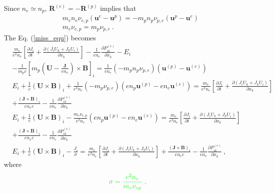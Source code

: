 \documentclass[12pt,a4paper]{article}
\renewcommand{\vec}[1]{\boldsymbol{#1}}
\begin{document}
Since $n_e \simeq n_p$, $\vec{R}^{(e)} = -\vec{R}^{(p)}$ implies that 
\begin{align*}
& \boxed{m_e n_e \nu_{e,p} (\vec{u}^{e} -\vec{u}^{p}) = -m_p n_p \nu_{p,e} (\vec{u}^{p} -\vec{u}^{e}) } \\
& m_e \nu_{e, p} = m_p \nu_{p, e} ~. 
\end{align*}
The Eq. (\ref{miss_equ}) becomes
\begin{align}
\nonumber & \boxed{ \frac{m_e}{e^2 n_e} \left[\frac{\partial J_i}{\partial t} +\frac{\partial (J_i U_k +J_k U_i)}{\partial x_k} \right] -\frac{1}{en_e} \frac{\partial P_{ik}^{(e)}}{\partial x_k} -E_i } \\ 
\nonumber & \boxed{ -\frac{1}{m_pc}\left[m_p\left( \vec{U}-\frac{\vec{J}}{en_e} \right)\times \vec{B} \right]_i = \frac{1}{en_e}(-m_pn_p \nu_{p,e}) \left(\vec{u}^{(p)} -\vec{u}^{(e)} \right) } \\
\nonumber & \boxed{E_i +\frac{1}{c} (\vec{U} \times \vec{B})_i + \frac{1}{e^2n_e}(-m_p \nu_{p,e}) \left(e n_p \vec{u}^{(p)} - en_e\vec{u}^{(e)} \right) = \frac{m_e}{e^2 n_e} \left[\frac{\partial J_i}{\partial t} +\frac{\partial (J_i U_k +J_k U_i)}{\partial x_k} \right] } \\
\nonumber & \boxed{+\frac{(\vec{J}\times \vec{B})_i}{en_e c} -\frac{1}{en_e} \frac{\partial P_{ik}^{(e)}}{\partial x_k}  } \\
\nonumber & \boxed{E_i +\frac{1}{c} (\vec{U} \times \vec{B})_i -\frac{m_e \nu_{e,p}}{e^2n_e} \left(e n_p \vec{u}^{(p)} - en_e\vec{u}^{(e)} \right) = \frac{m_e}{e^2 n_e} \left[\frac{\partial J_i}{\partial t} +\frac{\partial (J_i U_k +J_k U_i)}{\partial x_k} \right] } \\
\nonumber & \boxed{+\frac{(\vec{J}\times \vec{B})_i}{en_e c} -\frac{1}{en_e} \frac{\partial P_{ik}^{(e)}}{\partial x_k}  } \\
& E_i +\frac{1}{c} (\vec{U} \times \vec{B})_i -\frac{J_i}{\sigma} = \frac{m_e}{e^2 n_e} \left[\frac{\partial J_i}{\partial t} +\frac{\partial (J_i U_k +J_k U_i)}{\partial x_k} \right] +\frac{(\vec{J}\times \vec{B})_i}{en_e c} -\frac{1}{en_e} \frac{\partial P_{ik}^{(e)}}{\partial x_k} ~,
\label{ohm_gen}
\end{align}
where
\begin{equation*}
\color{green} \sigma = \frac{e^2 n_e}{m_e \nu_{ep} } ~,
\end{equation*}
\end{document}
